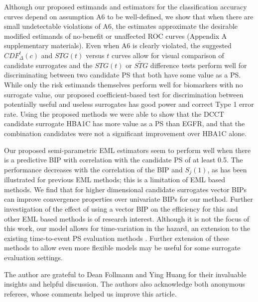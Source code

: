 \documentclass[times, doublespace]{simauth}
\begin{document}
Although our proposed estimands and estimators for the classification accuracy curves depend on assumption A6 to be well-defined, we show that when there are small undetectable violations of A6, the estimates approximate the desirable modified estimands of no-benefit or unaffected ROC curves (Appendix A supplementary materials). Even when A6 is clearly violated, the suggested $CDF^{t}_{\Delta}(c)$ and $STG(t)$ versus $t$ curves allow for visual comparison of candidate surrogates and the $STG(t)$ or $\widetilde{STG}$ difference tests perform well for discriminating between two candidate PS that both have some value as a PS. While only the risk estimands themselves perform well for biomarkers with no surrogate value, our proposed coefficient-based test for discrimination between potentially useful and useless surrogates has good power and correct Type 1 error rate. Using the proposed methods we were able to show that the DCCT candidate surrogate HBA1C has more value as a PS than EGFR, and that the combination candidates were not a significant improvement over HBA1C alone.

Our proposed semi-parametric EML estimators seem to perform well when there is a predictive BIP with correlation with the candidate PS of at least 0.5. The performance decreases with the correlation of the BIP and $S_j(1)$, as has been illustrated for previous EML methods; this is a limitation of EML based methods. We find that for higher dimensional candidate surrogates vector BIPs can improve convergence properties over univariate BIPs for our method. Further investigation of the effect of using a vector BIP on the efficiency for this and other EML based methods is of research interest. Although it is not the focus of this work, our model allows for time-variation in the hazard, an extension to the existing time-to-event PS evaluation methods \citep{Qin07, Miao13}. Further extension of these methods to allow even more flexible models may be useful for some surrogate evaluation settings. 

\ack The author are grateful to Dean Follmann and Ying Huang for their invaluable insights and helpful discussion. The authors also acknowledge both anonymous referees, whose comments helped us improve this article. 


%

\end{document}
